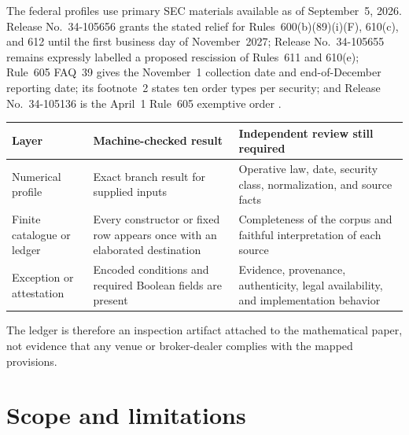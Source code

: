 \documentclass[11pt]{article}
\theoremstyle{definition}
\theoremstyle{remark}
\begin{document}
The federal profiles use primary SEC materials available as of September~5, 2026. Release No.~34-105656 grants the stated relief for Rules~600(b)(89)(i)(F), 610(c), and 612 until the first business day of November~2027; Release No.~34-105655 remains expressly labelled a proposed rescission of Rules~611 and 610(e); Rule~605 FAQ~39 gives the November~1 collection date and end-of-December reporting date; its footnote~2 states ten order types per security; and Release No.~34-105136 is the April~1 Rule~605 exemptive order \citep{sec2026relief,sec2026proposal,sec2026rule605faq,sec2026rule605order}.

\begin{center}
\small
\begin{tabular}{@{}>{\raggedright\arraybackslash}p{}>{\raggedright\arraybackslash}p{}>{\raggedright\arraybackslash}p{}@{}}
\toprule
Layer & Machine-checked result & Independent review still required \\
\midrule
Numerical profile & Exact branch result for supplied inputs & Operative law, date, security class, normalization, and source facts \\[3pt]
Finite catalogue or ledger & Every constructor or fixed row appears once with an elaborated destination & Completeness of the corpus and faithful interpretation of each source \\[3pt]
Exception or attestation & Encoded conditions and required Boolean fields are present & Evidence, provenance, authenticity, legal availability, and implementation behavior \\
\bottomrule
\end{tabular}
\end{center}

The ledger is therefore an inspection artifact attached to the mathematical paper, not evidence that any venue or broker-dealer complies with the mapped provisions.

\section{Scope and limitations}\label{sec:scope}
\end{document}

